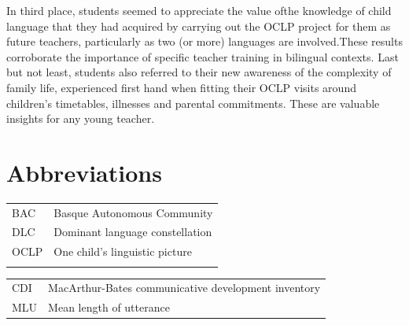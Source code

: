 \documentclass[output=paper]{../langscibook}
\begin{document}
In third place, students seemed to appreciate the value ofthe knowledge of child language that they had acquired by carrying out the OCLP project for them as future teachers, particularly as two (or more) languages are involved.These results corroborate the importance of specific teacher training in bilingual contexts.  Last but not least, students also referred to their new awareness of the complexity of family life, experienced first hand when fitting their OCLP visits around children's timetables, illnesses and parental commitments. These are valuable insights for any young teacher.  


\section{Abbreviations}
\label{sec:abbreviations}




\begin{tabular}{@{}ll}
BAC & Basque Autonomous Community\\
DLC & Dominant language constellation\\
OCLP & One child's linguistic picture\\
\\
\end{tabular}
\begin{tabularx}{.45\textwidth}{lX}
CDI & MacArthur-Bates communicative development inventory\\
MLU & Mean length of utterance\\
\end{tabularx}



\sloppy\printbibliography[heading=subbibliography,notkeyword=this]
\end{document}
